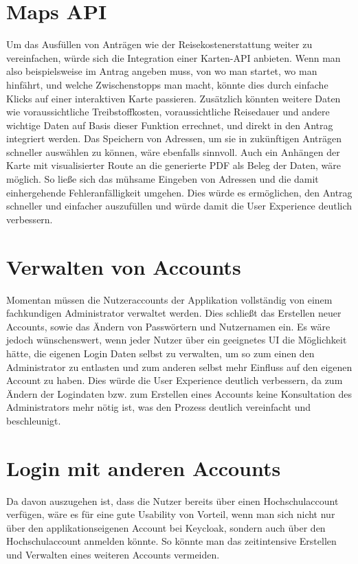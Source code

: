 \section{Maps \ac{API}}\label{sec: maps api}
Um das Ausfüllen von Anträgen wie der Reisekostenerstattung weiter zu vereinfachen, würde
sich die Integration einer Karten-\ac{API} anbieten. Wenn man also beispielsweise im
Antrag angeben muss, von wo man startet, wo man hinfährt, und welche Zwischenstopps man
macht, könnte dies durch einfache Klicks auf einer interaktiven Karte passieren. Zusätzlich
könnten weitere Daten wie voraussichtliche Treibstoffkosten, voraussichtliche Reisedauer
und andere wichtige Daten auf Basis dieser Funktion errechnet, und direkt in den Antrag
integriert werden. Das Speichern von Adressen, um sie in zukünftigen Anträgen schneller
auswählen zu können, wäre ebenfalls sinnvoll.
Auch ein Anhängen der Karte mit visualisierter Route an die generierte
PDF als Beleg der Daten, wäre möglich. So ließe sich das mühsame Eingeben von Adressen
und die damit einhergehende Fehleranfälligkeit umgehen. Dies würde es 
ermöglichen, den Antrag schneller und einfacher auszufüllen und würde damit die User
Experience deutlich verbessern.

\section{Verwalten von Accounts}\label{sec: verwalten von Accounts}
Momentan müssen die Nutzeraccounts der Applikation vollständig von einem fachkundigen
Administrator verwaltet werden. Dies schließt das Erstellen neuer Accounts, sowie das
Ändern von Passwörtern und Nutzernamen ein. Es wäre jedoch wünschenswert, wenn jeder
Nutzer über ein geeignetes \ac{UI} die Möglichkeit hätte, die eigenen Login Daten selbst
zu verwalten, um so zum einen den Administrator zu entlasten und zum anderen selbst mehr
Einfluss auf den eigenen Account zu haben. Dies würde die User Experience deutlich
verbessern, da zum Ändern der Logindaten bzw. zum Erstellen eines Accounts keine
Konsultation des Administrators mehr nötig ist, was den Prozess deutlich vereinfacht und
beschleunigt.

\section{Login mit anderen Accounts}\label{sec: login mit anderen Accounts}
Da davon auszugehen ist, dass die Nutzer bereits über einen Hochschulaccount verfügen,
wäre es für eine gute Usability von Vorteil, wenn man sich nicht nur über den
applikationseigenen Account bei Keycloak, sondern auch über den Hochschulaccount
anmelden könnte. So könnte man das zeitintensive Erstellen und Verwalten eines
weiteren Accounts vermeiden.


